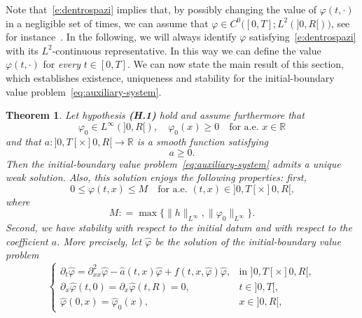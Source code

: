 \documentclass[11pt,leqno]{amsart}
\newtheorem{theorem}{Theorem}[section]
\numberwithin{equation}{section}
\begin{document}
Note that~\eqref{e:dentrospazi} implies that, by possibly changing the value of ${\varphi}(t, \cdot)$ in a negligible set of times, we can assume that 
${\varphi} \in C^0 \big( [0,T]; L^2 (]0, R[) \big)$, see for instance~\cite[Theorem 7.22]{Salsa}. In the following, we will always identify ${\varphi}$ satisfying~\eqref{e:dentrospazi} with its $L^2$-continuous representative. In this way we can define the value ${\varphi}(t, \cdot)$  for \emph{every} $t \in [0, T]$. We can now state the main result of this section, which establishes existence, uniqueness and stability for the initial-boundary value problem~\eqref{eq:auxiliary-system}. 
\begin{theorem}
  \label{p:classical} 
  Let hypothesis {\bf (H.1)} hold and assume furthermore that 
\begin{equation}
\label{e:condizionidatoiniziale}
    {\varphi}_0 \in L^\infty(]0, R[), \quad {\varphi}_0 (x) \ge 0 
    \quad \text{for a.e. $x \in {\mathbb{R}}$}
\end{equation}
and that $a: ]0, T[ \times ]0, R[ \to {\mathbb{R}}$ is a smooth function satisfying
\begin{equation}
\label{e:conda}
      a \ge 0.
\end{equation}
Then the initial-boundary value problem~\eqref{eq:auxiliary-system} admits a  
unique weak solution.
Also, this solution enjoys the following properties: first, 
\begin{equation}
\label{e:maxprin}
  0\leq \varphi(t, x) \leq M
  \quad \text{for a.e. $(t, x)\in ]0, T[ \times ]0, R[$,} 
\end{equation}
where 
\begin{equation}
\label{e:emme}
 M: = \max \{ \| h \|_{L^\infty}, \| \varphi_0 \|_{L^\infty}  \}. 
\end{equation}
Second, we have stability with respect to the initial datum and with respect to the coefficient $a$. More precisely, let  
$\widehat{\varphi}$ be the solution of the initial-boundary value problem
\begin{equation}
\label{e:ficappuccio}
\begin{cases}
{\partial_t} \hat {\varphi} =  {\partial_{xx}^2} \hat {\varphi} - \hat a (t, x) \hat {\varphi} + f(t, x, \hat {\varphi}) \hat
{\varphi}, & \text{in $]0, T[ \times ]0, R[$} ,  \\
{\partial_x } \hat {\varphi}(t,0)={\partial_x } \hat {\varphi}(t,R) = 0, & t \in ]0, T[, \\
\hat {\varphi}(0,x) = \hat {\varphi}_0(x), & x \in {]0,R[},
    \end{cases}

\end{equation}
\end{theorem}
\end{document}

